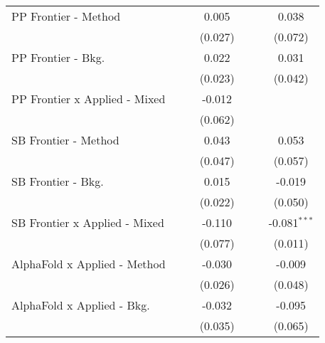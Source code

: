 \begin{tabular}{lcccccc}
   PP Frontier - Method           &               &               & 0.005         &               &               & 0.038\\   
                                  &               &               & (0.027)       &               &               & (0.072)\\   
   PP Frontier - Bkg.             &               &               & 0.022         &               &               & 0.031\\   
                                  &               &               & (0.023)       &               &               & (0.042)\\   
   PP Frontier x Applied - Mixed  &               &               & -0.012        &               &               &   \\   
                                  &               &               & (0.062)       &               &               &   \\   
   SB Frontier - Method           &               &               & 0.043         &               &               & 0.053\\   
                                  &               &               & (0.047)       &               &               & (0.057)\\   
   SB Frontier - Bkg.             &               &               & 0.015         &               &               & -0.019\\   
                                  &               &               & (0.022)       &               &               & (0.050)\\   
   SB Frontier x Applied - Mixed  &               &               & -0.110        &               &               & -0.081$^{***}$\\   
                                  &               &               & (0.077)       &               &               & (0.011)\\   
   AlphaFold x Applied - Method   &               &               & -0.030        &               &               & -0.009\\   
                                  &               &               & (0.026)       &               &               & (0.048)\\   
   AlphaFold x Applied - Bkg.     &               &               & -0.032        &               &               & -0.095\\   
                                  &               &               & (0.035)       &               &               & (0.065)\\   

\end{tabular}
